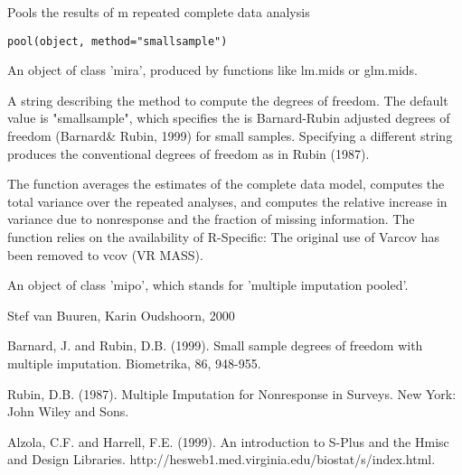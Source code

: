 \begin{Description}\relax
Pools the results of m repeated complete data analysis
\end{Description}
\begin{Usage}
\begin{verbatim}
pool(object, method="smallsample")
\end{verbatim}
\end{Usage}
\begin{Arguments}
\begin{ldescription}
\item[\code{object}] An object of class 'mira', produced by functions like lm.mids or glm.mids.
\item[\code{method}] A string describing the method to compute the degrees of freedom. 
The default value is "smallsample", which specifies the is 
Barnard-Rubin adjusted degrees of freedom (Barnard\& Rubin, 1999) 
for small samples. Specifying a different string 
produces the conventional degrees of freedom as in Rubin (1987).
\end{ldescription}
\end{Arguments}
\begin{Details}\relax
The function averages the estimates of the complete data model, 
computes the total variance over the repeated analyses, and computes
the relative increase in variance due to nonresponse and the fraction 
of missing information. The function relies on the availability
of
R-Specific: The original use of Varcov has been removed to vcov (VR MASS).
\end{Details}
\begin{Value}
An object of class 'mipo', which stands for 'multiple imputation pooled'.
\end{Value}
\begin{Author}\relax
Stef van Buuren, Karin Oudshoorn, 2000
\end{Author}
\begin{References}\relax
Barnard, J. and Rubin, D.B. (1999). Small sample degrees of freedom with
multiple imputation. Biometrika, 86, 948-955.

Rubin, D.B. (1987). Multiple Imputation for Nonresponse in Surveys. 
New York: John Wiley and Sons.

Alzola, C.F. and Harrell, F.E. (1999). An introduction to S-Plus and the Hmisc 
and Design Libraries. http://hesweb1.med.virginia.edu/biostat/s/index.html.
\end{References}
